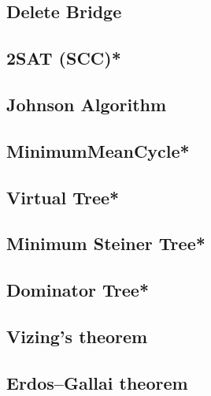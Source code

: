 \subsection{Delete Bridge} 

\subsection{2SAT (SCC)*} %

\subsection{Johnson Algorithm} %

\subsection{MinimumMeanCycle*} %

\subsection{Virtual Tree*} %

\subsection{Minimum Steiner Tree*} %

\subsection{Dominator Tree*} %

\subsection{Vizing's theorem}

\subsection{Erdos–Gallai theorem}



